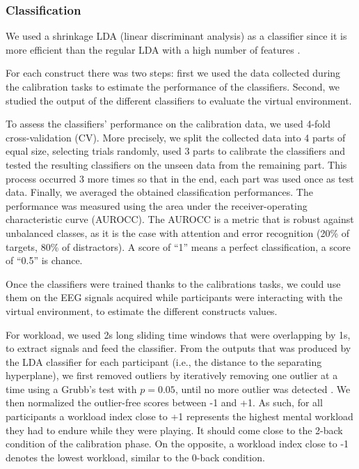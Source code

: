 \documentclass[]{sigchi}
\begin{document}
\subsubsection{Classification}\label{classification}

We used a shrinkage LDA (linear discriminant analysis) as a classifier
since it is more efficient than the regular LDA with a high number of
features \citep{Ledoit2004}.

For each construct there was two steps: first we used the data collected
during the calibration tasks to estimate the performance of the
classifiers. Second, we studied the output of the different classifiers
to evaluate the virtual environment.

To assess the classifiers' performance on the calibration data, we used
4-fold cross-validation (CV). More precisely, we split the collected
data into 4 parts of equal size, selecting trials randomly, used 3 parts
to calibrate the classifiers and tested the resulting classifiers on the
unseen data from the remaining part. This process occurred 3 more times
so that in the end, each part was used once as test data. Finally, we
averaged the obtained classification performances. The performance was
measured using the area under the receiver-operating characteristic
curve (AUROCC). The AUROCC is a metric that is robust against unbalanced
classes, as it is the case with attention and error recognition (20\% of
targets, 80\% of distractors). A score of ``1'' means a perfect
classification, a score of ``0.5'' is chance.

Once the classifiers were trained thanks to the calibrations tasks, we
could use them on the EEG signals acquired while participants were
interacting with the virtual environment, to estimate the different
constructs values.

For workload, we used 2s long sliding time windows that were overlapping
by 1s, to extract signals and feed the classifier. From the outputs that
was produced by the LDA classifier for each participant (i.e., the
distance to the separating hyperplane), we first removed outliers by
iteratively removing one outlier at a time using a Grubb's test with
$p=0.05$, until no more outlier was detected \citep{Grubbs1969}. We then
normalized the outlier-free scores between -1 and +1. As such, for all
participants a workload index close to +1 represents the highest mental
workload they had to endure while they were playing. It should come
close to the 2-back condition of the calibration phase. On the opposite,
a workload index close to -1 denotes the lowest workload, similar to the
0-back condition.
\end{document}
